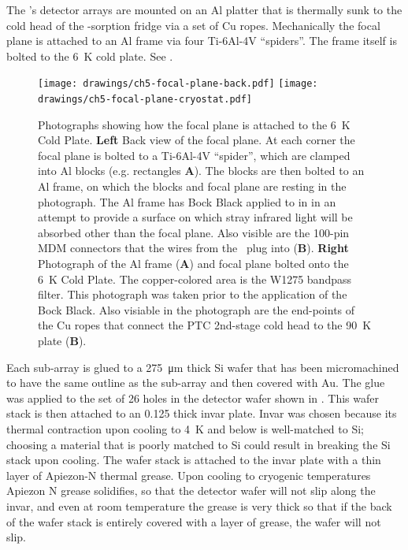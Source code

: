 The \Imager's detector arrays are mounted on an Al platter that is thermally sunk to the cold head of the -sorption fridge via a set of Cu ropes.
Mechanically the focal plane is attached to an Al frame via four Ti-6Al-4V ``spiders''.
The frame itself is bolted to the \SI{6}{\K} cold plate.
See .

\begin{figure}
\centering
\texttt{[image: drawings/ch5-focal-plane-back.pdf]}
\texttt{[image: drawings/ch5-focal-plane-cryostat.pdf]}
\caption{
  Photographs showing how the focal plane is attached to the \SI{6}{\K} Cold Plate.
  \textbf{Left}
  Back view of the focal plane.
  At each corner the focal plane is bolted to a Ti-6Al-4V ``spider'', which are clamped into Al blocks (e.g. rectangles \textbf{A}).
  The blocks are then bolted to an Al frame, on which the blocks and focal plane are resting in the photograph.
  The Al frame has Bock Black \cite{xxx} applied to in in an attempt to provide a surface on which stray infrared light will be absorbed other than the focal plane.
  Also visible are the 100-pin MDM connectors that the wires from the \MCE\ plug into (\textbf{B}).
  \textbf{Right}
  Photograph of the Al frame (\textbf{A}) and focal plane bolted onto the \SI{6}{\K} Cold Plate.
  The copper-colored area is the W1275 bandpass filter.
  This photograph was taken prior to the application of the Bock Black.
  Also visiable in the photograph are the end-points of the Cu ropes that connect the PTC 2nd-stage cold head to the \SI{90}{\K} plate (\textbf{B}).
}
\label{fig:ch5-focal-plane-back}
\end{figure}

Each sub-array is glued to a \SI{275}{\um} thick Si wafer that has been micromachined to have the same outline as the sub-array and then covered with Au.
The glue was applied to the set of 26 holes in the detector wafer shown in .
This wafer stack is then attached to an \SI{0.125}{\in} thick invar plate.
Invar was chosen because its thermal contraction upon cooling to \SI{4}{\K} and below is well-matched to Si; choosing a material that is poorly matched to Si could result in breaking the Si stack upon cooling.
The wafer stack is attached to the invar plate with a thin layer of Apiezon-N thermal grease.
Upon cooling to cryogenic temperatures Apiezon N grease solidifies, so that the detector wafer will not slip along the invar, and even at room temperature the grease is very thick so that if the back of the wafer stack is entirely covered with a layer of grease, the wafer will not slip.

